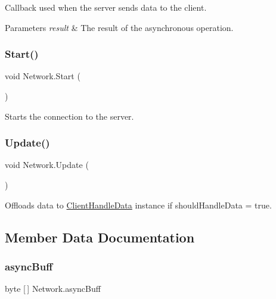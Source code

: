 Callback used when the server sends data to the client. 


\begin{DoxyParams}{Parameters}
{\em result} & The result of the asynchronous operation.\\
\hline
\end{DoxyParams}
\mbox{\label{class_network_a52a8cefa1ecd639175ae18f217342783}} 
\subsubsection{\texorpdfstring{Start()}{Start()}}
{\footnotesize\ttfamily void Network.\+Start (\begin{DoxyParamCaption}{ }\end{DoxyParamCaption})\hspace{0.3cm}{\ttfamily [private]}}



Starts the connection to the server. 

\mbox{\label{class_network_ace78b88ac04b110eeaa5f51fdd643780}} 
\subsubsection{\texorpdfstring{Update()}{Update()}}
{\footnotesize\ttfamily void Network.\+Update (\begin{DoxyParamCaption}{ }\end{DoxyParamCaption})\hspace{0.3cm}{\ttfamily [private]}}



Offloads data to \mbox{\hyperlink{class_client_handle_data}{Client\+Handle\+Data}} instance if should\+Handle\+Data = true. 



\subsection{Member Data Documentation}
\mbox{\label{class_network_a514e88f1b6a82d1c2de4e3e3b197c529}} 
\subsubsection{\texorpdfstring{asyncBuff}{asyncBuff}}
{\footnotesize\ttfamily byte \mbox{[}$\,$\mbox{]} Network.\+async\+Buff\hspace{0.3cm}{\ttfamily [private]}}




